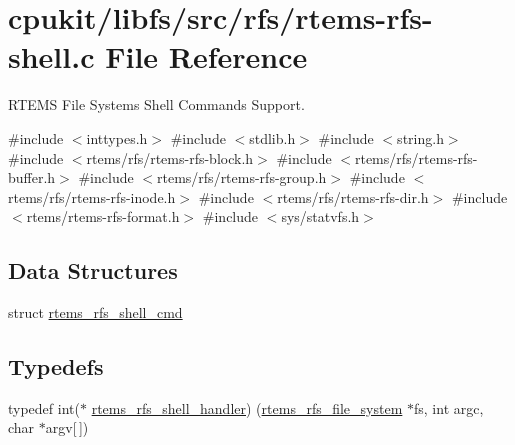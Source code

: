 \hypertarget{rtems-rfs-shell_8c}{}\section{cpukit/libfs/src/rfs/rtems-\/rfs-\/shell.c File Reference}
\label{rtems-rfs-shell_8c}


R\+T\+E\+MS File Systems Shell Commands Support.  


{\ttfamily \#include $<$inttypes.\+h$>$}\newline
{\ttfamily \#include $<$stdlib.\+h$>$}\newline
{\ttfamily \#include $<$string.\+h$>$}\newline
{\ttfamily \#include $<$rtems/rfs/rtems-\/rfs-\/block.\+h$>$}\newline
{\ttfamily \#include $<$rtems/rfs/rtems-\/rfs-\/buffer.\+h$>$}\newline
{\ttfamily \#include $<$rtems/rfs/rtems-\/rfs-\/group.\+h$>$}\newline
{\ttfamily \#include $<$rtems/rfs/rtems-\/rfs-\/inode.\+h$>$}\newline
{\ttfamily \#include $<$rtems/rfs/rtems-\/rfs-\/dir.\+h$>$}\newline
{\ttfamily \#include $<$rtems/rtems-\/rfs-\/format.\+h$>$}\newline
{\ttfamily \#include $<$sys/statvfs.\+h$>$}\newline
\subsection*{Data Structures}
\begin{DoxyCompactItemize}
\item 
struct \mbox{\hyperlink{structrtems__rfs__shell__cmd}{rtems\+\_\+rfs\+\_\+shell\+\_\+cmd}}
\end{DoxyCompactItemize}
\subsection*{Typedefs}
\begin{DoxyCompactItemize}
\item 
typedef int($\ast$ \mbox{\hyperlink{rtems-rfs-shell_8c_ae8b3b669ad0ff98c8773ddd56bb66f32}{rtems\+\_\+rfs\+\_\+shell\+\_\+handler}}) (\mbox{\hyperlink{struct__rtems__rfs__file__system}{rtems\+\_\+rfs\+\_\+file\+\_\+system}} $\ast$fs, int argc, char $\ast$argv\mbox{[}$\,$\mbox{]})
\end{DoxyCompactItemize}
